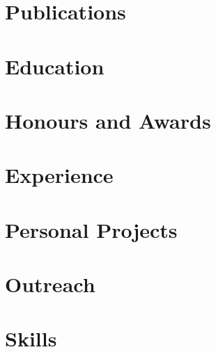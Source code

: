 \documentclass[english,a4paper,10pt]{extarticle}
\begin{document}
\def\role{} %

\pagestyle{only_footer}
\thispagestyle{header_footer}



\section{Publications}


\section{Education}


\section{Honours and Awards}


\section{Experience}


\newpage
\section{Personal Projects}


\section{Outreach}


\section{Skills}


\end{document}
